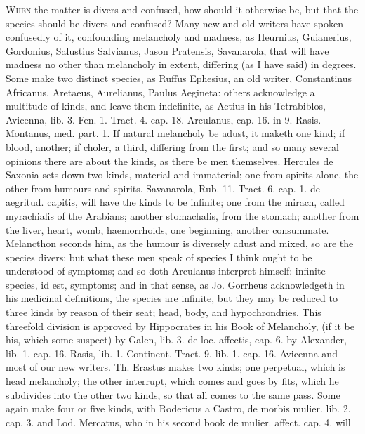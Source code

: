 {\lettrine{W}{hen} the matter is divers and confused, how should it otherwise be, but
that the species should be divers and confused? Many new and old
writers have spoken confusedly of it, confounding melancholy and
madness, as  Heurnius, Guianerius, Gordonius, Salustius
Salvianus, Jason Pratensis, Savanarola, that will have madness no other
than melancholy in extent, differing (as I have said) in degrees. Some
make two distinct species, as Ruffus Ephesius, an old writer,
Constantinus Africanus, Aretaeus,  Aurelianus, Paulus
Aegineta: others acknowledge a multitude of kinds, and leave them
indefinite, as Aetius in his Tetrabiblos, Avicenna, lib. 3. Fen.
1. Tract. 4. cap. 18. Arculanus, cap. 16. in 9. Rasis. Montanus, med.
part. 1. If natural melancholy be adust, it maketh one kind; if
blood, another; if choler, a third, differing from the first; and so
many several opinions there are about the kinds, as there be men
themselves. Hercules de Saxonia sets down two kinds, material and
immaterial; one from spirits alone, the other from humours and spirits.
Savanarola, Rub. 11. Tract. 6. cap. 1. de aegritud. capitis, will have
the kinds to be infinite; one from the mirach, called myrachialis of
the Arabians; another stomachalis, from the stomach; another from the
liver, heart, womb, haemorrhoids, one beginning, another
consummate. Melancthon seconds him, as the humour is diversely
adust and mixed, so are the species divers; but what these men speak of
species I think ought to be understood of symptoms; and so doth 
Arculanus interpret himself: infinite species, id est, symptoms; and in
that sense, as Jo. Gorrheus acknowledgeth in his medicinal definitions,
the species are infinite, but they may be reduced to three kinds by
reason of their seat; head, body, and hypochrondries. This threefold
division is approved by Hippocrates in his Book of Melancholy, (if it
be his, which some suspect) by Galen, lib. 3. de loc. affectis, cap. 6.
by Alexander, lib. 1. cap. 16. Rasis, lib. 1. Continent. Tract. 9. lib.
1. cap. 16. Avicenna and most of our new writers. Th. Erastus makes two
kinds; one perpetual, which is head melancholy; the other interrupt,
which comes and goes by fits, which he subdivides into the other two
kinds, so that all comes to the same pass. Some again make four or five
kinds, with Rodericus a Castro, de morbis mulier. lib. 2. cap. 3. and
Lod. Mercatus, who in his second book de mulier. affect. cap. 4. will
}
